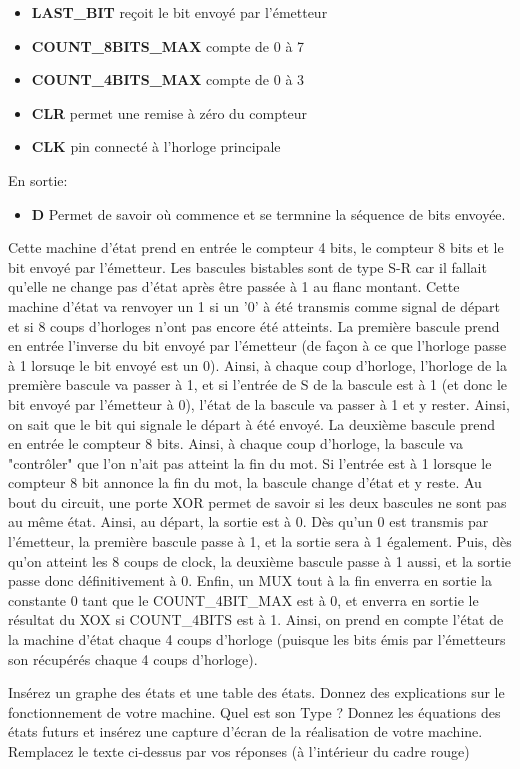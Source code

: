 \documentclass[a4paper]{article} %
\begin{document}
\begin{tcolorbox}[colframe=Monokaimagenta,colback=white]
\begin{itemize}
    \item     \textbf{LAST_BIT} reçoit le bit envoyé par l'émetteur
    \item     \textbf{COUNT_8BITS_MAX} compte de 0 à 7
    \item     \textbf{COUNT_4BITS_MAX} compte de 0 à 3
    \item     \textbf{CLR} permet une remise à zéro du compteur
    \item     \textbf{CLK} pin connecté à l'horloge principale
\end{itemize}
En sortie:
\begin{itemize}
    \item     \textbf{D} Permet de savoir où commence et se termnine la séquence de bits envoyée.
\end{itemize}
Cette machine d'état prend en entrée le compteur 4 bits, le compteur 8 bits et le bit envoyé par l'émetteur. Les bascules bistables sont de type S-R car il fallait qu'elle ne change pas d'état après être passée à 1 au flanc montant. Cette machine d'état va renvoyer un 1 si un '0' à été transmis comme signal de départ et si 8 coups d'horloges n'ont pas encore été atteints.
La première bascule prend en entrée l'inverse du bit envoyé par l'émetteur (de façon à ce que l'horloge passe à 1 lorsuqe le bit envoyé est un 0). Ainsi, à chaque coup d'horloge, l'horloge de la première bascule va passer à 1, et si l'entrée de S de la bascule est à 1 (et donc le bit envoyé par l'émetteur à 0), l'état de la bascule va passer à 1 et y rester. Ainsi, on sait que le bit qui signale le départ à été envoyé.
La deuxième bascule prend en entrée le compteur 8 bits. Ainsi, à chaque coup d'horloge, la bascule va "contrôler" que l'on n'ait pas atteint la fin du mot. Si l'entrée est à 1 lorsque le compteur 8 bit annonce la fin du mot, la bascule change d'état et y reste.
Au bout du circuit, une porte XOR permet de savoir si les deux bascules ne sont pas au même état.
Ainsi, au départ, la sortie est à 0. Dès qu'un 0 est transmis par l'émetteur, la première bascule passe à 1, et la sortie sera à 1 également. Puis, dès qu'on atteint les 8 coups de clock, la deuxième bascule passe à 1 aussi, et la sortie passe donc définitivement à 0.
Enfin, un MUX tout à la fin enverra en sortie la constante 0 tant que le COUNT_4BIT_MAX est à 0, et enverra en sortie le résultat du XOX si COUNT_4BITS est à 1. Ainsi, on prend en compte l'état de la machine d'état chaque 4 coups d'horloge (puisque les bits émis par l'émetteurs son récupérés chaque 4 coups d'horloge).

Insérez un graphe des états et une table des états. Donnez des explications sur le fonctionnement de votre machine. Quel est son Type ?
Donnez les équations des états futurs et insérez une capture d’écran de la réalisation de votre machine.
Remplacez le texte ci-dessus par vos réponses (à l’intérieur du cadre rouge)
\\
\end{tcolorbox}
\end{document}
